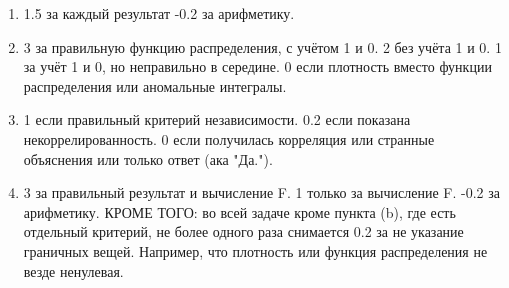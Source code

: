 \documentclass[12pt]{article}
\begin{document}
\begin{enumerate}
    \begin{enumerate}
    \item  1.5 за каждый результат -0.2 за арифметику.
    \item  3 за правильную функцию распределения, с учётом 1 и 0.
    2 без учёта 1 и 0.
    1 за учёт 1 и 0, но неправильно в середине.
    0 если плотность вместо функции распределения или аномальные интегралы.
    \item 1 если правильный критерий независимости.
    0.2 если показана некоррелированность.
    0 если получилась корреляция или странные объяснения или только ответ (ака "Да.").
    \item 3 за правильный результат и вычисление F.
    1 только за вычисление F.
    -0.2 за арифметику.
    КРОМЕ ТОГО: во всей задаче кроме пункта (b), где есть отдельный критерий, не более одного раза снимается 0.2 за не указание граничных вещей.
    Например, что плотность или функция распределения не везде ненулевая.
\end{enumerate}

\end{enumerate}
\end{document}
